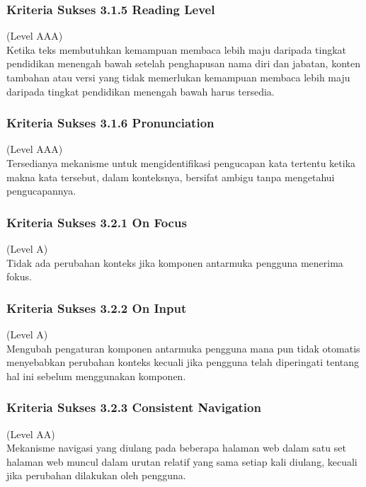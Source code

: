\subsubsection{Kriteria Sukses 3.1.5 Reading Level}
\label{sec:kriteria_3.1.5}
(Level AAA) \\

Ketika teks membutuhkan kemampuan membaca lebih maju daripada tingkat pendidikan menengah bawah setelah penghapusan nama diri dan jabatan, konten tambahan atau versi yang tidak memerlukan kemampuan membaca lebih maju daripada tingkat pendidikan menengah bawah harus tersedia.

\subsubsection{Kriteria Sukses 3.1.6 Pronunciation}
\label{sec:kriteria_3.1.6}
(Level AAA) \\

Tersedianya mekanisme untuk mengidentifikasi pengucapan kata tertentu ketika makna kata tersebut, dalam konteksnya, bersifat ambigu tanpa mengetahui pengucapannya.

\subsubsection{Kriteria Sukses 3.2.1 On Focus}
\label{sec:kriteria_3.2.1}
(Level A) \\

Tidak ada perubahan konteks jika komponen antarmuka pengguna menerima fokus.

\subsubsection{Kriteria Sukses 3.2.2 On Input}
\label{sec:kriteria_3.2.2}
(Level A) \\

Mengubah pengaturan komponen antarmuka pengguna mana pun tidak otomatis menyebabkan perubahan konteks kecuali jika pengguna telah diperingati tentang hal ini sebelum menggunakan komponen.

\subsubsection{Kriteria Sukses 3.2.3 Consistent Navigation}
\label{sec:kriteria_3.2.3}
(Level AA) \\

Mekanisme navigasi yang diulang pada beberapa halaman web dalam satu set halaman web muncul dalam urutan relatif yang sama setiap kali diulang, kecuali jika perubahan dilakukan oleh pengguna.

